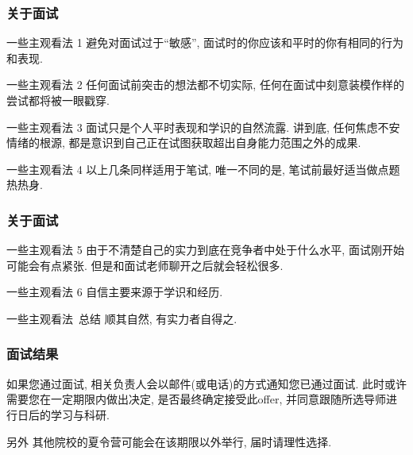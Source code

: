 \documentclass[usenames,dvipsnames]{beamer}
\begin{document}
    \begin{frame}
      \frametitle{关于面试}
      \small
      \begin{block}{一些主观看法 1}
        避免对面试过于``敏感'', 面试时的你应该和平时的你有相同的行为和表现.
      \end{block}
      \begin{alertblock}{一些主观看法 2}
        任何面试前突击的想法都不切实际, 任何在面试中刻意装模作样的尝试都将被一眼戳穿.
      \end{alertblock}
      \begin{block}{一些主观看法 3}
        面试只是个人平时表现和学识的自然流露. 讲到底, 任何焦虑不安情绪的根源, 都是意识到自己正在试图获取超出自身能力范围之外的成果.
      \end{block}
      \begin{block}{一些主观看法 4}
        以上几条同样适用于笔试, 唯一不同的是, 笔试前最好适当做点题热热身.
      \end{block}

    \end{frame}

    \begin{frame}
      \frametitle{关于面试}
      \begin{block}{一些主观看法 5}
        由于不清楚自己的实力到底在竞争者中处于什么水平, 面试刚开始可能会有点紧张. 但是和面试老师聊开之后就会轻松很多.
      \end{block}

      \begin{block}{一些主观看法 6}
        自信主要来源于学识和经历.
      \end{block}

      \begin{block}{一些主观看法\  总结}
        顺其自然, 有实力者自得之.
      \end{block}
    \end{frame}

    \begin{frame}
      \frametitle{面试结果}
      如果您通过面试, 相关负责人会以邮件(或电话)的方式通知您已通过面试. 此时或许需要您在一定期限内做出决定, 是否最终确定接受此offer, 并同意跟随所选导师进行日后的学习与科研. 
      
      \begin{block}{另外}
        其他院校的夏令营可能会在该期限以外举行, 届时请理性选择.
      \end{block} 
    \end{frame}
\end{document}
